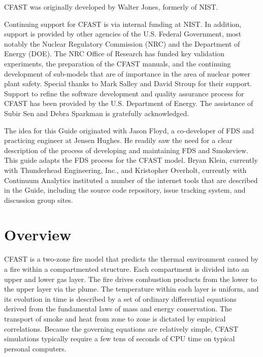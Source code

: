 \documentclass[12pt]{book}
\begin{document}
\label{acksection}

CFAST was originally developed by Walter Jones, formerly of NIST.

Continuing support for CFAST is via internal funding at NIST. In addition, support is provided by other agencies of the U.S. Federal Government, most notably the Nuclear Regulatory Commission (NRC) and the Department of Energy (DOE). The NRC Office of Research has funded key validation experiments, the preparation of the CFAST manuals, and the continuing development of sub-models that are of importance in the area of nuclear power plant safety. Special thanks to Mark Salley and David Stroup for their support. Support to refine the software development and quality assurance process for CFAST has been provided by the U.S. Department of Energy. The assistance of Subir Sen and Debra Sparkman is gratefully acknowledged.

The idea for this Guide originated with Jason Floyd, a co-developer of FDS and practicing engineer at Jensen Hughes. He readily saw the need for a clear description of the process of developing and maintaining FDS and Smokeview. This guide adapts the FDS process for the CFAST model.  Bryan Klein, currently with Thunderhead Engineering, Inc., and Kristopher Overholt, currently with Continuum Analytics instituted a number of the internet tools that are described in the Guide, including the source code repository, issue tracking system, and discussion group sites.


\tableofcontents

\listoffigures


\mainmatter

\chapter{Overview}

CFAST is a two-zone fire model that predicts the thermal environment caused by a fire within a compartmented structure. Each compartment is divided into an upper and lower gas layer. The fire drives combustion products from the lower to the upper layer via the plume. The temperature within each layer is uniform, and its evolution in time is described by a set of ordinary differential equations derived from the fundamental laws of mass and energy conservation. The transport of smoke and heat from zone to zone is dictated by empirical correlations. Because the governing equations are relatively simple, CFAST simulations typically require a few tens of seconds of CPU time on typical personal computers.
\end{document}
